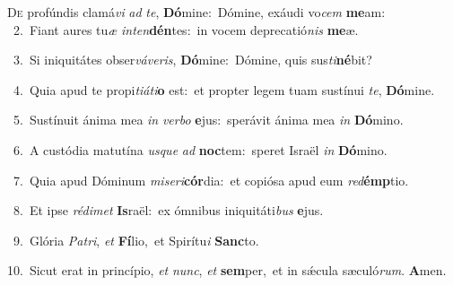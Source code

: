 \lettrine{\initial\textcolor{\initialcolor}{D}}{e} profúndis clamá\textit{vi} \textit{ad} \textit{te}\-, \textbf{Dó}\-mine:~\star Dómine, exáudi vo\textit{cem} \textbf{me}\-am:\\
{\numbfont\textcolor{\numbcolor}{~2.}}~Fiant aures tu\textit{æ} \textit{in}\-\textit{ten}\textbf{dén}tes:~\star in vocem deprecatió\textit{nis} \textbf{me}\-æ.\par
{\numbfont\textcolor{\numbcolor}{~3.}}~Si iniquitátes obser\-\textit{vá}\-\textit{ve}\textit{ris}, \textbf{Dó}\-mine:~\star Dómine, quis sus\-\textit{ti}\-\textbf{né}bit?\par
{\numbfont\textcolor{\numbcolor}{~4.}}~Quia apud te propi\-\textit{ti}\-\textit{á}\textit{ti}\textbf{o} est:~\star et propter legem tuam sustínui \textit{te}\-, \textbf{Dó}\-mine.\par
{\numbfont\textcolor{\numbcolor}{~5.}}~Sustínuit ánima mea \textit{in} \textit{ver}\-\textit{bo} \textbf{e}\-jus:~\star sperávit ánima mea \textit{in} \textbf{Dó}\-mino.\par
{\numbfont\textcolor{\numbcolor}{~6.}}~A custódia matutína \textit{us}\-\textit{que} \textit{ad} \textbf{noc}\-tem:~\star speret Israël \textit{in} \textbf{Dó}\-mino.\par
{\numbfont\textcolor{\numbcolor}{~7.}}~Quia apud Dóminum \textit{mi}\-\textit{se}\textit{ri}\textbf{cór}dia:~\star et copiósa apud eum \textit{red}\-\textbf{émp}tio.\par
{\numbfont\textcolor{\numbcolor}{~8.}}~Et ipse \textit{réd}\-\textit{i}\textit{met} \textbf{Is}\-raël:~\star ex ómnibus iniquitáti\textit{bus} \textbf{e}\-jus.\par
{\numbfont\textcolor{\numbcolor}{~9.}}~Glória \textit{Pa}\-\textit{tri}, \textit{et} \textbf{Fí}\-lio,~\star et Spirítu\textit{i} \textbf{Sanc}\-to.\par
{\numbfont\textcolor{\numbcolor}{10.}}~Sicut erat in princípio, \textit{et} \textit{nunc}\-, \textit{et} \textbf{sem}\-per,~\star et in sǽcula sæculó\-\textit{rum}\-. \textbf{A}\-men.\par

